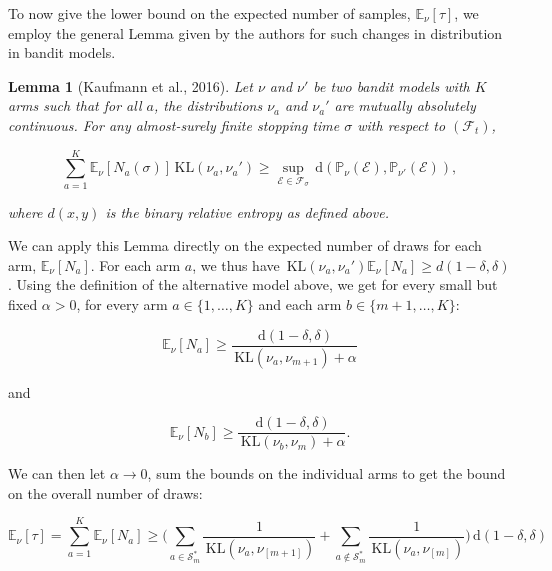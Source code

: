 \documentclass[12pt,]{article}
\newtheorem{lemma}{Lemma}
\newcommand{\KL}{\,\text{KL}}
\newcommand{\der}{\,\text{d}}
\begin{document}
To now give the lower bound on the expected number of samples,
\(\mathbb{E}_{\nu}[\tau]\), we employ the general Lemma given by the
authors for such changes in distribution in bandit models.

\begin{lemma}[Kaufmann et al., 2016] \label{theorem:KaufmannEtAlLemma1}
Let $\nu$ and $\nu'$ be two bandit models with $K$ arms such that for all $a$, the distributions $\nu_a$ and $\nu_a'$ are mutually absolutely continuous. For any almost-surely finite stopping time $\sigma$ with respect to $(\mathcal{F}_t)$,

\begin{equation*}
\sum_{a=1}^{K} \mathbb{E}_{\nu} [N_a(\sigma)] \KL(\nu_a, \nu_a') \geq \sup_{\mathcal{E} \in \mathcal{F}_{\sigma}} \der (\mathbb{P}_{\nu}(\mathcal{E}), \mathbb{P}_{\nu'}(\mathcal{E})),
\end{equation*}

where $d(x,y)$ is the binary relative entropy as defined above.
\end{lemma}

We can apply this Lemma directly on the expected number of draws for
each arm, \(\mathbb{E}_{\nu}[N_a]\). For each arm \(a\), we thus have
\(\KL(\nu_a, \nu_a') \mathbb{E}_{\nu}[N_a] \geq d(1-\delta, \delta)\).
Using the definition of the alternative model above, we get for every
small but fixed \(\alpha > 0\), for every arm \(a \in \{1, \dots, K\}\)
and each arm \(b \in \{m+1, \dots, K\}\):

\begin{equation*}
\mathbb{E}_{\nu}[N_a] \geq \frac{\der(1-\delta, \delta)}{\KL (\nu_a, \nu_{m+1}) + \alpha}
\end{equation*}

and

\begin{equation*}
\mathbb{E}_{\nu}[N_b] \geq \frac{\der(1-\delta, \delta)}{\KL (\nu_b, \nu_{m}) + \alpha}.
\end{equation*}

We can then let \(\alpha \to 0\), sum the bounds on the individual arms
to get the bound on the overall number of draws:

\begin{equation*}
\mathbb{E}_{\nu}[\tau] = \sum_{a=1}^K \mathbb{E}_{\nu}[N_a] \geq \Big( \sum_{a \in \mathcal{S}_m^*} \frac{1}{\KL(\nu_a, \nu_{[m+1]})} + \sum_{a \notin \mathcal{S}_m^*} \frac{1}{\KL(\nu_a, \nu_{[m]})} \Big) \der(1-\delta, \delta)
\end{equation*}
\end{document}
